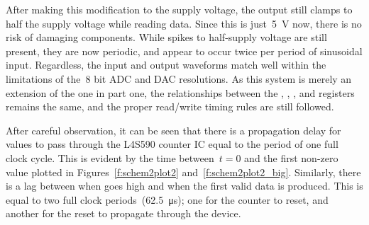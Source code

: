 %
After making this modification to the supply voltage, the output still clamps
to half the supply voltage while reading data.  Since this is
just~\SI{5}{\volt} now, there is no risk of damaging components.  While spikes
to half-supply voltage are still present, they are now periodic, and appear to
occur twice per period of sinusoidal input.  Regardless, the input and output
waveforms match well within the limitations of the~8 bit ADC and DAC
resolutions.  As this system is merely an extension of the one in part one, the
relationships between the , , , and  registers
remains the same, and the proper read/write timing rules are still followed.

After careful observation, it can be seen that there is a propagation delay for
values to pass through the L4S590 counter IC equal to the period of one full
clock cycle.  This is evident by the time between~$t = 0$ and the first
non-zero value plotted in Figures~\ref{f:schem2plot2}
and~\ref{f:schem2plot2_big}.  Similarly, there is a lag between when 
goes high and when the first valid data is produced.  This is equal to two full
clock periods~(\SI{62.5}{\micro\second}); one for the counter to reset, and
another for the reset to propagate through the device.

